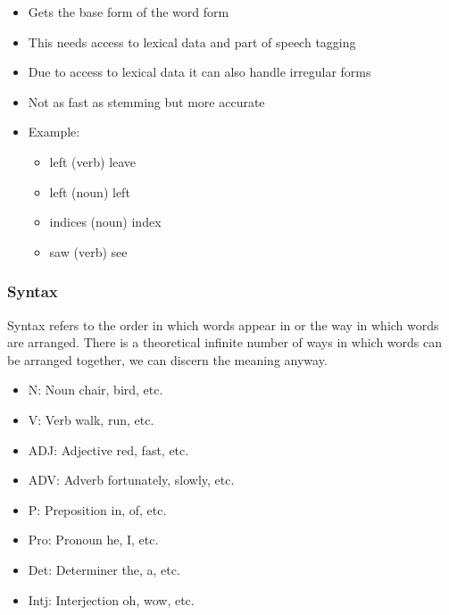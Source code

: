 \documentclass[
../../NLP4W_Summary.tex,
]
{subfiles}
\begin{document}
\begin{greenbox}
\begin{itemize}
\begin{itemize}
            \item Gets the base form of the word form
            \item This needs access to lexical data and part of speech tagging
            \item Due to access to lexical data it can also handle irregular forms
            \item Not as fast as stemming but more accurate
            \item Example:
            \begin{itemize}
                \item left (verb) \rightarrow leave
                \item left (noun) \rightarrow left
                \item indices (noun) \rightarrow index
                \item saw (verb) \rightarrow see
            \end{itemize}
        \end{itemize}
    \end{itemize}
\end{greenbox}

\subsubsection{Syntax}
Syntax refers to the order in which words appear in or the way in which words are arranged. There is a theoretical infinite number of ways in which words can be arranged together, we can discern the meaning anyway.

\begin{greenbox}
    \begin{itemize}
        \item N: Noun \rightarrow chair, bird, etc.
        \item V: Verb \rightarrow walk, run, etc.
        \item ADJ: Adjective \rightarrow red, fast, etc.
        \item ADV: Adverb \rightarrow fortunately, slowly, etc.
        \item P: Preposition \rightarrow in, of, etc.
        \item Pro: Pronoun \rightarrow he, I, etc.
        \item Det: Determiner \rightarrow the, a, etc.
        \item Intj: Interjection \rightarrow oh, wow, etc.
    \end{itemize}
\end{greenbox}
\end{document}
